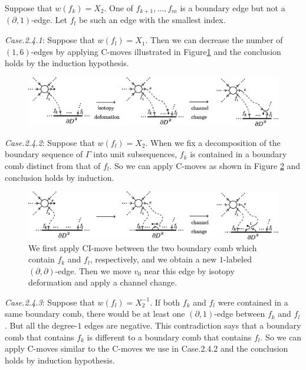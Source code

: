 \documentclass{amsart}
\theoremstyle{plain}
\theoremstyle{definition}
\begin{document}
Suppose that $w(f_k)=X_2$. 
One of $f_{k+1},\ldots,f_m$ is a boundary edge but not a $(\partial,1)$-edge. 
Let $f_l$ be such an edge with the smallest index. 

\par

{\it Case.2.4.1}: Suppose that $w(f_l)=X_1$. 
Then we can decrease the number of $(1,6)$-edges by applying C-moves illustrated in Figure\ref{move_case24.2} 
and the conclusion holds by the induction hypothesis. 

\begin{figure}[htbp]
\begin{center}
\includegraphics[width=145mm]{move_case242.eps}
\end{center}
\caption{}
\label{move_case24.2}
\end{figure}

{\it Case.2.4.2}: Suppose that $w(f_l)=X_2$. 
When we fix a decomposition of the boundary sequence of $\Gamma$ into unit subsequences, 
$f_k$ is contained in a boundary comb distinct from that of $f_l$. 
So we can apply C-moves as shown in Figure \ref{move_case24.3} and conclusion holds by induction. 

\begin{figure}[htbp]
\begin{center}
\includegraphics[width=145mm]{move_case243.eps}
\end{center}
\caption{We first apply CI-move between the two boundary comb which contain $f_k$ and $f_l$, respectively, and we obtain a new $1$-labeled $(\partial,\partial)$-edge. 
Then we move $v_0$ near this edge by isotopy deformation and apply a channel change. }
\label{move_case24.3}
\end{figure}

{\it Case.2.4.3}: Suppose that $w(f_l)=X_2^{-1}$. 
If both $f_k$ and $f_l$ were contained in a same boundary comb, there would be at least one $(\partial,1)$-edge between $f_k$ and $f_l$. 
But all the degree-$1$ edges are negative. 
This contradiction says that a boundary comb that contains $f_k$ is different to a boundary comb that contains $f_l$. 
So we can apply C-moves similar to the C-moves we use in Case.2.4.2 and the conclusion holds by induction hypothesis. 
\end{document}
